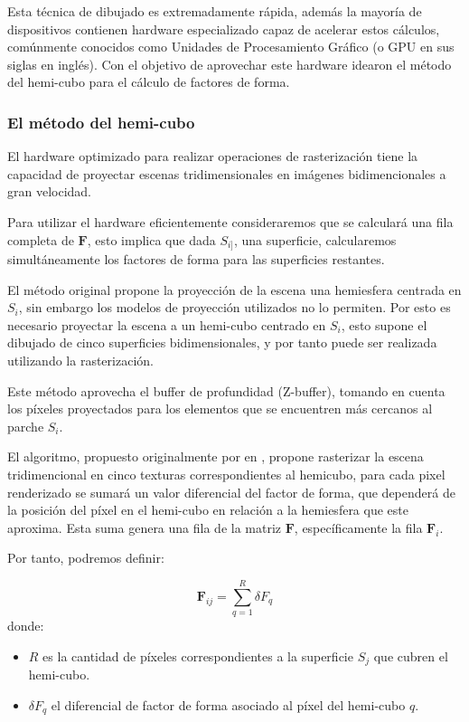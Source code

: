 Esta técnica de dibujado es extremadamente rápida, además la mayoría de dispositivos contienen hardware especializado capaz de acelerar estos cálculos, comúnmente conocidos como Unidades de Procesamiento Gráfico (o GPU en sus siglas en inglés). Con el objetivo de aprovechar este hardware \citeauthor{Cohen} idearon el método del hemi-cubo para el cálculo de factores de forma.

\subsubsection{El método del hemi-cubo}

El hardware optimizado para realizar operaciones de rasterización tiene la capacidad de proyectar escenas tridimensionales en imágenes bidimencionales a gran velocidad.

Para utilizar el hardware eficientemente consideraremos que se calculará una fila completa de $\mathbf{F}$, esto implica que dada $S_{i]}$, una superficie, calcularemos simultáneamente los factores de forma para las superficies restantes. 

El método original propone la proyección de la escena una hemiesfera centrada en $S_{i}$, sin embargo los modelos de proyección utilizados no lo permiten. Por esto es necesario proyectar la escena a un hemi-cubo centrado en $S_{i}$, esto supone el dibujado de cinco superficies bidimensionales, y por tanto puede ser realizada utilizando la rasterización.

Este método aprovecha el buffer de profundidad (Z-buffer), tomando en cuenta los píxeles proyectados para los elementos que se encuentren más cercanos al parche $S_{i}$.

El algoritmo, propuesto originalmente por \citeauthor{Cohen} en \citeyear{Cohen}, propone rasterizar la escena tridimencional en cinco texturas correspondientes al hemicubo, para cada pixel renderizado se sumará un valor diferencial del factor de forma, que dependerá de la posición del píxel en el hemi-cubo en relación a la hemiesfera que este aproxima. Esta suma genera una fila de la matriz $\mathbf{F}$, específicamente la fila $\mathbf{F}_{i}$.

Por tanto, podremos definir:

\begin{equation}
	\mathbf{F}_{ij} = \sum_{q=1}^{R} \delta{F_{q}}
	\label{eq:ffgreenberg}
\end{equation}
donde:
\begin{itemize}
	\item $R$ es la cantidad de píxeles correspondientes a la superficie $S_{j}$ que cubren el hemi-cubo.
	\item $\delta{F_{q}}$ el diferencial de factor de forma asociado al píxel del hemi-cubo $q$.
\end{itemize}

